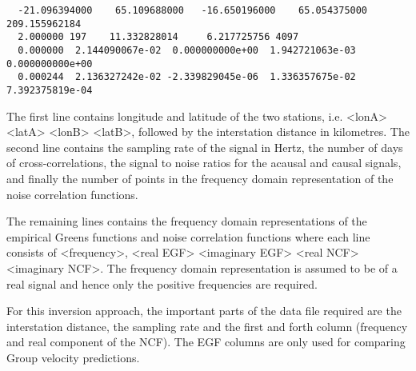 \documentclass{article}
\begin{document}
\begin{verbatim}
  -21.096394000    65.109688000   -16.650196000    65.054375000   209.155962184
  2.000000 197    11.332828014     6.217725756 4097
  0.000000  2.144090067e-02  0.000000000e+00  1.942721063e-03  0.000000000e+00
  0.000244  2.136327242e-02 -2.339829045e-06  1.336357675e-02  7.392375819e-04
\end{verbatim}

The first line contains longitude and latitude of the two stations,
i.e. <lonA> <latA> <lonB> <latB>, followed by the interstation
distance in kilometres. The second line contains the sampling rate of
the signal in Hertz, the number of days of cross-correlations, the
signal to noise ratios for the acausal and causal signals, and finally
the number of points in the frequency domain representation of the
noise correlation functions.

The remaining lines contains the frequency domain representations of
the empirical Greens functions and noise correlation functions where
each line consists of <frequency>, <real EGF> <imaginary EGF> <real
NCF> <imaginary NCF>. The frequency domain representation is assumed
to be of a real signal and hence only the positive frequencies are
required.

For this inversion approach, the important parts of the data file
required are the interstation distance, the sampling rate and the
first and forth column (frequency and real component of the NCF). The
EGF columns are only used for comparing Group velocity predictions.
\end{document}
